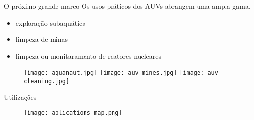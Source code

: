 
\begin{frame}[c]{O próximo grande marco}
    Os usos práticos dos AUVs abrangem uma ampla gama.
    \begin{itemize}
        \item exploração subaquática
        \item limpeza de minas
        \item limpeza ou monitaramento de reatores nucleares
    \end{itemize}

    \begin{figure}
        \texttt{[image: aquanaut.jpg]}
        \texttt{[image: auv-mines.jpg]}
        \texttt{[image: auv-cleaning.jpg]}
        \caption{\nocite{WatchMee87:online}}
        \caption{\nocite{Alookbac39:online}}
        \caption{\nocite{MeetAqua67:online}}
        \caption{\nocite{jain2015review}}
    \end{figure}
\end{frame}
\begin{frame}[c]{Utilizações}
        \begin{figure}
        \texttt{[image: aplications-map.png]}
    \end{figure}
\end{frame}

